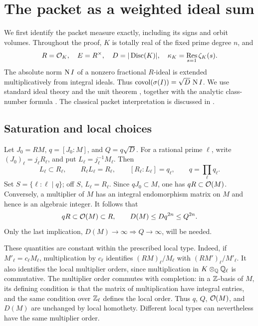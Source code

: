 \section{The packet as a weighted ideal sum}\label{sec:packets}

We first identify the packet measure exactly, including its signs and
orbit volumes. Throughout the proof, $K$ is totally real of the fixed
prime degree $n$, and
\[
 R=\mathcal O_K,\quad E=R^\times,\quad D=|\operatorname{Disc}(K)|,\quad
 \kappa_K=\operatorname*{Res}_{s=1}\zeta_K(s).
\]
The absolute norm $\operatorname{N} I$ of a nonzero fractional $R$-ideal is extended
multiplicatively from integral ideals. Thus
$\operatorname{covol}(\sigma(I))=\sqrt D\,\operatorname{N} I$.
We use standard ideal theory and the unit theorem
\cite[Chapters~3--5]{Milne2020}, together with the analytic
class-number formula \cite[Theorem~19.12]{Sutherland2021}.
The classical packet interpretation is discussed in
\cite[Sections~2 and~5]{ELMV2011}.

\subsection{Saturation and local choices}

Let $J_0=RM$, $q=[J_0:M]$, and $Q=q\sqrt D$. For a rational prime
$\ell$, write $(J_0)_\ell=j_\ell R_\ell$, and put
$L_\ell=j_\ell^{-1}M_\ell$. Then
\begin{equation}\label{eq:local-normalization}
 L_\ell\subset R_\ell,\qquad R_\ell L_\ell=R_\ell,\qquad
 [R_\ell:L_\ell]=q_\ell,\qquad q=\prod_\ell q_\ell.
\end{equation}
Set $S=\{\ell:\ell\mid q\}$; off $S$, $L_\ell=R_\ell$.
Since $qJ_0\subset M$, one has $qR\subset\mathcal O(M)$.
Conversely, a multiplier of $M$ has an integral endomorphism matrix
on $M$ and hence is an algebraic integer. It follows that
\begin{equation}\label{eq:discriminant-scale}
 qR\subset\mathcal O(M)\subset R,\qquad
 D(M)\le Dq^{2n}\le Q^{2n}.
\end{equation}
Only the last implication, $D(M)\to\infty\Rightarrow Q\to\infty$,
will be needed.

These quantities are constant within the prescribed local type.
Indeed, if $M'_\ell=c_\ell M_\ell$, multiplication by $c_\ell$
identifies $(RM)_\ell/M_\ell$ with $(RM')_\ell/M'_\ell$.
It also identifies the local multiplier orders, since multiplication
in $K\otimes_\mathbb Q\mathbb Q_\ell$ is commutative. The multiplier order commutes
with completion: in a $\mathbb Z$-basis of $M$, its defining condition is
that the matrix of multiplication have integral entries, and the
same condition over $\mathbb Z_\ell$ defines the local order. Thus $q$,
$Q$, $\mathcal O(M)$, and $D(M)$ are unchanged by local homothety.
Different local types can nevertheless have the same multiplier order.

